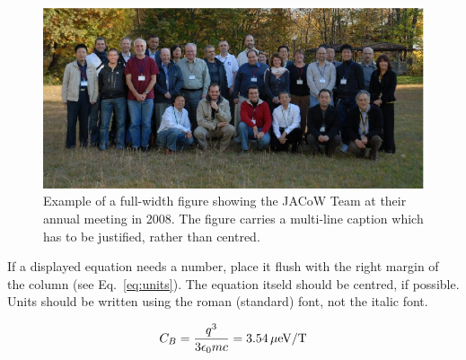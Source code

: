 \documentclass{JAC2003}
\begin{document}

\begin{figure}[tb]
    \centering
    \includegraphics*[width=168mm]{JACpic2v2.eps}
    \caption{Example of a full-width figure showing the JACoW Team at their annual meeting in 2008. 
    The figure carries a multi-line caption which has to be justified, rather than centred.}
    \label{l2ea4-f2}
\end{figure}

If a displayed equation needs a number, place it flush with the right
margin of the column (see Eq.~\ref{eq:units}). The equation itseld should be centred, if possible.
Units should be written
using the roman (standard) font, not the italic font.

\begin{equation}\label{eq:units}
    C_B={q^3\over 3\epsilon_{0} mc}=3.54\,\hbox{$\mu$eV/T}
\end{equation}
\end{document}
